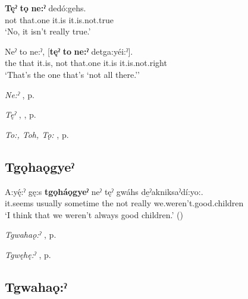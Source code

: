 \ea
\label{ex:tpart63}
\gll \textbf{Tęˀ} \textbf{tǫ} \textbf{ne:ˀ} dedó:gehs.\\
not that.one it.is it.is.not.true\\
\glt ‘No, it isn’t really true.’
\z

\ea
\label{ex:tpart64}
\gll Neˀ to ne:ˀ, [\textbf{tęˀ} \textbf{to} \textbf{ne:ˀ} detga:yéi:ˀ].\\
the that it.is, not that.one it.is it.is.not.right\\
\glt ‘That’s the one that’s ‘not all there.’’
\z

\begin{CayugaRelated}
\item \textit{Ne:ˀ} , p. \pageref{p:[ne:ˀ] `it is’}\\
\item \textit{Tęˀ} , , p. \pageref{p:[tęˀ]}\\
\item \textit{To:, Toh, Tǫ:} , p. \pageref{p:[to:] ‘that one’}
\end{CayugaRelated}

\subsection*{\textbf{Tgǫhaǫgyeˀ} } \label{p:[tgǫhaǫgyeˀ]}

\ea
\label{ex:tpart65}
\gll A:yę́:ˀ gę:s \textbf{tgǫháǫgyeˀ} neˀ tęˀ gwáhs de̱ˀakniksaˀdí:yo:.\\
it.seems usually sometime the not really we.weren’t.good.children\\
\glt ‘I think that we weren’t always good children.’ (\cite{henry_de_2005})
\z


\begin{CayugaRelated}
\item \textit{Tgwahaǫ:ˀ} , p. \pageref{p:[tgwahaǫ:ˀ]}\\
\item \textit{Tgwęhę:ˀ} , p. \pageref{p:[tgwęhę:ˀ]}
\end{CayugaRelated}


\subsection*{\textbf{Tgwahaǫ:ˀ} } \label{p:[tgwahaǫ:ˀ]}

